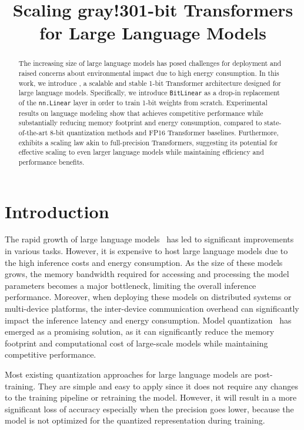 \title{Scaling gray!30{1-bit} Transformers for Large Language Models}

\begin{abstract}
The increasing size of large language models has posed challenges for deployment and raised concerns about environmental impact due to high energy consumption. In this work, we introduce \our{}, a scalable and stable 1-bit Transformer architecture designed for large language models. Specifically, we introduce \texttt{BitLinear} as a drop-in replacement of the \texttt{nn.Linear} layer in order to train 1-bit weights from scratch. Experimental results on language modeling show that \our{} achieves competitive performance while substantially reducing memory footprint and energy consumption, compared to state-of-the-art 8-bit quantization methods and FP16 Transformer baselines. Furthermore, \our{} exhibits a scaling law akin to full-precision Transformers, suggesting its potential for effective scaling to even larger language models while maintaining efficiency and performance benefits.
\end{abstract}

\section{Introduction}

The rapid growth of large language models~\cite{gpt3, gpt4, palm, palm2, llama, llama2} has led to significant improvements in various tasks. However, it is expensive to host large language models due to the high inference costs and energy consumption. As the size of these models grows, the memory bandwidth required for accessing and processing the model parameters becomes a major bottleneck, limiting the overall inference performance. Moreover, when deploying these models on distributed systems or multi-device platforms, the inter-device communication overhead can significantly impact the inference latency and energy consumption. Model quantization~\cite{gptq, quip, smoothquant} has emerged as a promising solution, as it can significantly reduce the memory footprint and computational cost of large-scale models while maintaining competitive performance.

Most existing quantization approaches for large language models are post-training. They are simple and easy to apply since it does not require any changes to the training pipeline or retraining the model. However, it will result in a more significant loss of accuracy especially when the precision goes lower, because the model is not optimized for the quantized representation during training.

